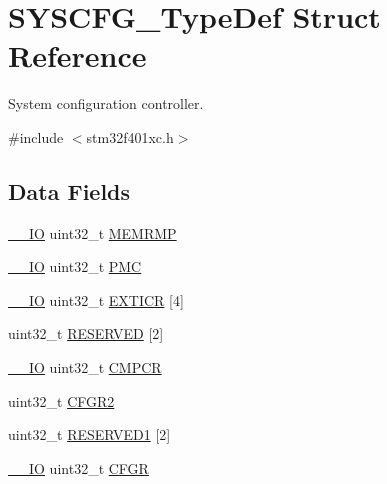 \hypertarget{struct_s_y_s_c_f_g___type_def}{}\section{S\+Y\+S\+C\+F\+G\+\_\+\+Type\+Def Struct Reference}
\label{struct_s_y_s_c_f_g___type_def}


System configuration controller.  




{\ttfamily \#include $<$stm32f401xc.\+h$>$}

\subsection*{Data Fields}
\begin{DoxyCompactItemize}
\item 
\hyperlink{core__sc300_8h_aec43007d9998a0a0e01faede4133d6be}{\+\_\+\+\_\+\+IO} uint32\+\_\+t \hyperlink{struct_s_y_s_c_f_g___type_def_ab36c409d0a009e3ce5a89ac55d3ff194}{M\+E\+M\+R\+MP}
\item 
\hyperlink{core__sc300_8h_aec43007d9998a0a0e01faede4133d6be}{\+\_\+\+\_\+\+IO} uint32\+\_\+t \hyperlink{struct_s_y_s_c_f_g___type_def_a2130abf1fefb63ce4c4b138fd8c9822a}{P\+MC}
\item 
\hyperlink{core__sc300_8h_aec43007d9998a0a0e01faede4133d6be}{\+\_\+\+\_\+\+IO} uint32\+\_\+t \hyperlink{struct_s_y_s_c_f_g___type_def_af18ed332be387d38ef90cccdfd3f78fc}{E\+X\+T\+I\+CR} \mbox{[}4\mbox{]}
\item 
uint32\+\_\+t \hyperlink{struct_s_y_s_c_f_g___type_def_a896190d6ac50dc6d53ff0c0c2520a4ad}{R\+E\+S\+E\+R\+V\+ED} \mbox{[}2\mbox{]}
\item 
\hyperlink{core__sc300_8h_aec43007d9998a0a0e01faede4133d6be}{\+\_\+\+\_\+\+IO} uint32\+\_\+t \hyperlink{struct_s_y_s_c_f_g___type_def_a08ddbac546fa9928256654d31255c8c3}{C\+M\+P\+CR}
\item 
uint32\+\_\+t \hyperlink{struct_s_y_s_c_f_g___type_def_aa9c12d51311ff64cc0b667e695e7f850}{C\+F\+G\+R2}
\item 
uint32\+\_\+t \hyperlink{struct_s_y_s_c_f_g___type_def_a3c50f8698052818ea3024b4b52d65886}{R\+E\+S\+E\+R\+V\+E\+D1} \mbox{[}2\mbox{]}
\item 
\hyperlink{core__sc300_8h_aec43007d9998a0a0e01faede4133d6be}{\+\_\+\+\_\+\+IO} uint32\+\_\+t \hyperlink{struct_s_y_s_c_f_g___type_def_a26f1e746ccbf9c9f67e7c60e61085ec1}{C\+F\+GR}
\end{DoxyCompactItemize}


